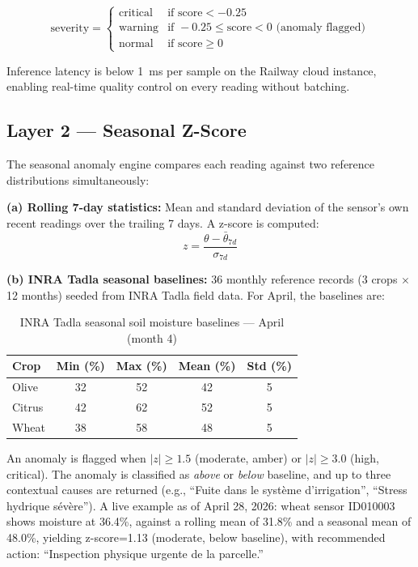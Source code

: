 \documentclass[12pt,a4paper]{report}
\begin{document}
\begin{equation}
  \text{severity} = \begin{cases}
    \text{critical} & \text{if score} < -0.25 \\
    \text{warning}  & \text{if } -0.25 \leq \text{score} < 0 \text{ (anomaly flagged)} \\
    \text{normal}   & \text{if } \text{score} \geq 0
  \end{cases}
\end{equation}

Inference latency is below 1~ms per sample on the Railway cloud instance, enabling real-time quality control on every reading without batching.

\subsection{Layer 2 --- Seasonal Z-Score}

The seasonal anomaly engine compares each reading against two reference distributions simultaneously:

\textbf{(a) Rolling 7-day statistics:} Mean and standard deviation of the sensor's own recent readings over the trailing 7 days. A z-score is computed:
\begin{equation}
  z = \frac{\theta - \bar{\theta}_{7d}}{\sigma_{7d}}
\end{equation}

\textbf{(b) INRA Tadla seasonal baselines:} 36 monthly reference records (3 crops $\times$ 12 months) seeded from INRA Tadla field data. For April, the baselines are:

\begin{table}[H]
\centering
\caption{INRA Tadla seasonal soil moisture baselines --- April (month 4)}
\label{tab:baselines}
\begin{tabular}{lcccc}
\toprule
\textbf{Crop} & \textbf{Min (\%)} & \textbf{Max (\%)} & \textbf{Mean (\%)} & \textbf{Std (\%)} \\
\midrule
Olive  & 32 & 52 & 42 & 5 \\
Citrus & 42 & 62 & 52 & 5 \\
Wheat  & 38 & 58 & 48 & 5 \\
\bottomrule
\end{tabular}
\end{table}

An anomaly is flagged when $|z| \geq 1.5$ (moderate, amber) or $|z| \geq 3.0$ (high, critical). The anomaly is classified as \textit{above} or \textit{below} baseline, and up to three contextual causes are returned (e.g., ``Fuite dans le système d'irrigation'', ``Stress hydrique sévère''). A live example as of April 28, 2026: wheat sensor ID010003 shows moisture at 36.4\%, against a rolling mean of 31.8\% and a seasonal mean of 48.0\%, yielding z-score=1.13 (moderate, below baseline), with recommended action: ``Inspection physique urgente de la parcelle.''
\end{document}
